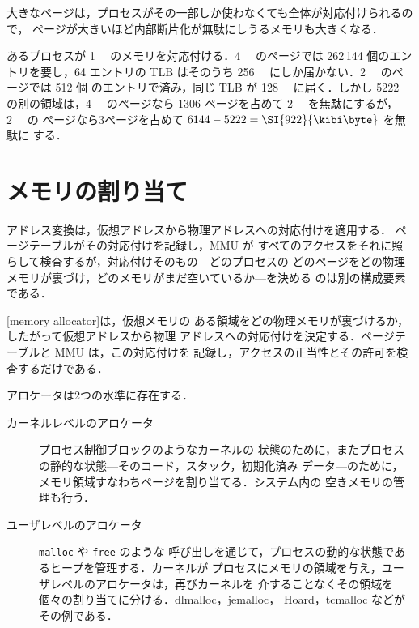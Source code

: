 \documentclass[../main.tex]{subfiles}
\begin{document}
大きなページは，プロセスがその一部しか使わなくても全体が対応付けられるので，
ページが大きいほど内部断片化が無駄にしうるメモリも大きくなる．

\begin{example}
  あるプロセスが \SI{1}{\gibi\byte} のメモリを対応付ける．\SI{4}{\kibi\byte}
  のページでは 262\,144 個のエントリを要し，64 エントリの TLB はそのうち
  \SI{256}{\kibi\byte} にしか届かない．\SI{2}{\mebi\byte} のページでは 512 個
  のエントリで済み，同じ TLB が \SI{128}{\mebi\byte} に届く．しかし
  \SI{5222}{\kibi\byte} の別の領域は，\SI{4}{\kibi\byte} のページなら 1306
  ページを占めて \SI{2}{\kibi\byte} を無駄にするが，\SI{2}{\mebi\byte} の
  ページなら3ページを占めて $6144 - 5222 = \SI{922}{\kibi\byte}$ を無駄に
  する．
\end{example}

\section{メモリの割り当て}
\label{sec:l08-allocation}

アドレス変換は，仮想アドレスから物理アドレスへの対応付けを適用する．
ページテーブルがその対応付けを記録し，MMU が
すべてのアクセスをそれに照らして検査するが，対応付けそのもの---どのプロセスの
どのページをどの物理メモリが裏づけ，どのメモリがまだ空いているか---を決める
のは別の構成要素である．

\begin{definition}[メモリアロケータ]
  [memory allocator]は，仮想メモリの
  ある領域をどの物理メモリが裏づけるか，したがって仮想アドレスから物理
  アドレスへの対応付けを決定する．ページテーブルと MMU は，この対応付けを
  記録し，アクセスの正当性とその許可を検査するだけである．
\end{definition}

アロケータは2つの水準に存在する．
\begin{description}
  \item[カーネルレベルのアロケータ] プロセス制御ブロックのようなカーネルの
    状態のために，またプロセスの静的な状態---そのコード，スタック，初期化済み
    データ---のために，メモリ領域すなわちページを割り当てる．システム内の
    空きメモリの管理も行う．
  \item[ユーザレベルのアロケータ] \texttt{malloc} や \texttt{free} のような
    呼び出しを通じて，プロセスの動的な状態であるヒープを管理する．カーネルが
    プロセスにメモリの領域を与え，ユーザレベルのアロケータは，再びカーネルを
    介することなくその領域を個々の割り当てに分ける．dlmalloc，jemalloc，
    Hoard，tcmalloc などがその例である．
\end{description}
\end{document}
